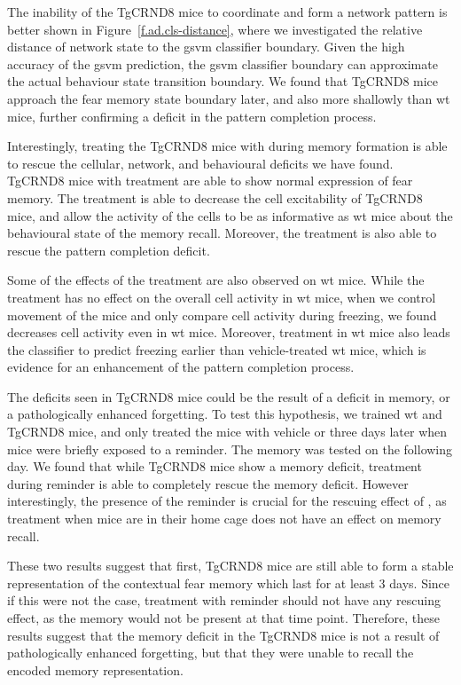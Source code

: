 The inability of the TgCRND8 mice to coordinate and form a network pattern is better shown in Figure~\ref{f.ad.cls-distance}, where we investigated the relative distance of network state to the \gls{gsvm} classifier boundary. Given the high accuracy of the \gls{gsvm} prediction, the \gls{gsvm} classifier boundary can approximate the actual behaviour state transition boundary. We found that TgCRND8 mice approach the fear memory state boundary later, and also more shallowly than \gls{wt} mice, further confirming a deficit in the pattern completion process. 

Interestingly, treating the TgCRND8 mice with \tglu{} during memory formation is able to rescue the cellular, network, and behavioural deficits we have found. TgCRND8 mice with \tglu{} treatment are able to show normal expression of fear memory. The \tglu{} treatment is able to decrease the cell excitability of TgCRND8 mice, and allow the activity of the cells to be as informative as \gls{wt} mice about the behavioural state of the memory recall. Moreover, the \tglu{} treatment is also able to rescue the pattern completion deficit. 

Some of the effects of the \tglu{} treatment are also observed on \gls{wt} mice. While the \tglu{} treatment has no effect on the overall cell activity in \gls{wt} mice, when we control movement of the mice and only compare cell activity during freezing, we found \tglu{} decreases cell activity even in \gls{wt} mice. Moreover, \tglu{} treatment in \gls{wt} mice also leads the classifier to predict freezing earlier than vehicle-treated \gls{wt} mice, which is evidence for an enhancement of the pattern completion process. 

The deficits seen in TgCRND8 mice could be the result of a deficit in memory, or a pathologically enhanced forgetting. To test this hypothesis, we trained \gls{wt} and TgCRND8 mice, and only treated the mice with vehicle or \tglu{} three days later when mice were briefly exposed to a reminder. The memory was tested on the following day. We found that while TgCRND8 mice show a memory deficit, \tglu{} treatment during reminder is able to completely rescue the memory deficit. However interestingly, the presence of the reminder is crucial for the rescuing effect of \tglu, as \tglu{} treatment when mice are in their home cage does not have an effect on memory recall. 

These two results suggest that first, TgCRND8 mice are still able to form a stable representation of the contextual fear memory which last for at least 3 days. Since if this were not the case, \tglu{} treatment with reminder should not have any rescuing effect, as the memory would not be present at that time point. Therefore, these results suggest that the memory deficit in the TgCRND8 mice is not a result of pathologically enhanced forgetting, but that they were unable to recall the encoded memory representation.


